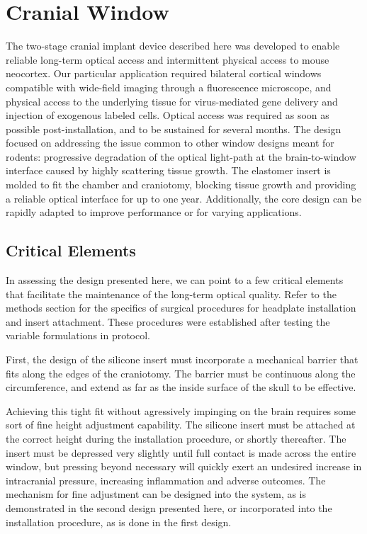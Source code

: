 \documentclass[
  12pt,
]{report}
\numberwithin{figure}{section}
\numberwithin{table}{section}
\numberwithin{equations}{section}
\begin{document}
\hypertarget{cranial-window}{%
\section{Cranial Window}\label{cranial-window}}

The two-stage cranial implant device described here was developed to
enable reliable long-term optical access and intermittent physical
access to mouse neocortex. Our particular application required bilateral
cortical windows compatible with wide-field imaging through a
fluorescence microscope, and physical access to the underlying tissue
for virus-mediated gene delivery and injection of exogenous labeled
cells. Optical access was required as soon as possible
post-installation, and to be sustained for several months. The design
focused on addressing the issue common to other window designs meant for
rodents: progressive degradation of the optical light-path at the
brain-to-window interface caused by highly scattering tissue growth. The
elastomer insert is molded to fit the chamber and craniotomy, blocking
tissue growth and providing a reliable optical interface for up to one
year. Additionally, the core design can be rapidly adapted to improve
performance or for varying applications.

\hypertarget{critical-elements}{%
\subsection{Critical Elements}\label{critical-elements}}

In assessing the design presented here, we can point to a few critical
elements that facilitate the maintenance of the long-term optical
quality. Refer to the methods section for the specifics of surgical
procedures for headplate installation and insert attachment. These
procedures were established after testing the variable formulations in
protocol.

First, the design of the silicone insert must incorporate a mechanical
barrier that fits along the edges of the craniotomy. The barrier must be
continuous along the circumference, and extend as far as the inside
surface of the skull to be effective.

Achieving this tight fit without agressively impinging on the brain
requires some sort of fine height adjustment capability. The silicone
insert must be attached at the correct height during the installation
procedure, or shortly thereafter. The insert must be depressed very
slightly until full contact is made across the entire window, but
pressing beyond necessary will quickly exert an undesired increase in
intracranial pressure, increasing inflammation and adverse outcomes. The
mechanism for fine adjustment can be designed into the system, as is
demonstrated in the second design presented here, or incorporated into
the installation procedure, as is done in the first design.
\end{document}
